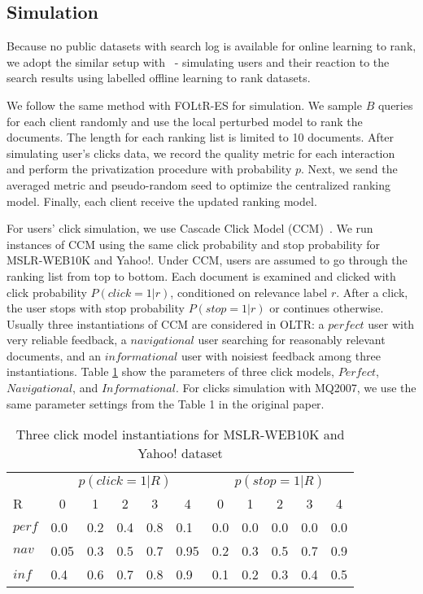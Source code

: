 \subsection{Simulation}

Because no public datasets with search log is available for online learning to rank, we adopt the similar setup with~\cite{DBLP:conf/wsdm/SchuthOWR16, DBLP:conf/wsdm/HofmannSWR13} - simulating users and their reaction to the search results using labelled offline learning to rank datasets.

We follow the same method with FOLtR-ES for simulation. We sample $B$ queries for each client randomly and use the local perturbed model to rank the documents. The length for each ranking list is limited to 10 documents. After simulating user's clicks data, we record the quality metric for each interaction and perform the privatization procedure with probability $p$. Next, we send the averaged metric and pseudo-random seed to optimize the centralized ranking model. Finally, each client receive the updated ranking model. 

For users' click simulation, we use Cascade Click Model (CCM)~\cite{DBLP:conf/wsdm/GuoLW09}. We run instances of CCM using the same click probability and stop probability for MSLR-WEB10K and Yahoo!. Under CCM, users are assumed to go through the ranking list from top to bottom. Each document is examined and clicked with click probability $P(click = 1 | r)$, conditioned on relevance label $r$. After a click, the user stops with stop probability $P(stop = 1 | r)$ or continues otherwise. Usually three instantiations of CCM are considered in OLTR: a $perfect$ user with very reliable feedback, a $navigational$ user searching for reasonably relevant documents, and an $informational$ user with noisiest feedback among three instantiations.  Table \ref{mslr-CCM} show the parameters of three click models, $Perfect$, $Navigational$, and $Informational$. For clicks simulation with MQ2007, we use the same parameter settings from the Table 1 in the original paper.


\newcommand{\tc}[1]{\multicolumn{1}{c}{#1}}
\setlength{\tabcolsep}{3mm}

\begin{table}[t!]
	\centering
	\caption[centre]{Three click model instantiations for MSLR-WEB10K and Yahoo! dataset}\label{mslr-CCM}
	\begin{tabularx}{\textwidth}{XXXXXXXXXXX}
		\toprule
		& \multicolumn{5}{c}{$p(click=1|R)$} & \multicolumn{5}{c}{$p(stop=1|R)$} \\
		\cmidrule(r){2-6}  \cmidrule(){7-11}
		R & \tc{0}& \tc{1} &\tc{2} & \tc{3}& \tc{4}&  \tc{0} & \tc{1} & \tc{2} & \tc{3} & \tc{4} \\
		\midrule
		$perf$ & 0.0 & 0.2 & 0.4 & 0.8 & 0.1& 0.0 & 0.0 & 0.0 & 0.0 & 0.0\\
		$nav$ & 0.05 & 0.3 & 0.5 & 0.7 & 0.95& 0.2 & 0.3 & 0.5 & 0.7 & 0.9\\
		$inf$ & 0.4 & 0.6 & 0.7 & 0.8 & 0.9& 0.1 & 0.2 & 0.3 & 0.4 & 0.5\\
		\bottomrule
	\end{tabularx}
	\vspace{-10pt}
\end{table}

